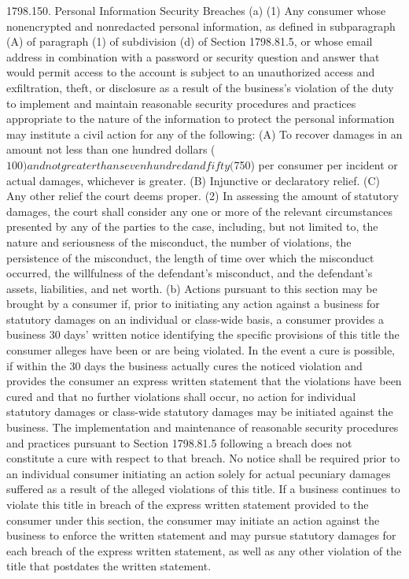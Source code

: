 1798.150.  Personal Information Security Breaches
(a) (1) Any consumer whose nonencrypted and nonredacted personal information, as defined in subparagraph (A) of paragraph (1) of subdivision (d) of Section 1798.81.5, or whose email address in combination with a password or security question and answer that would permit access to the account is subject to an unauthorized access and exfiltration, theft, or disclosure as a result of the business’s violation of the duty to implement and maintain reasonable security procedures and practices appropriate to the nature of the information to protect the personal information may institute a civil action for any of the following:
(A) To recover damages in an amount not less than one hundred dollars ($100) and not greater than seven hundred and fifty ($750) per consumer per incident or actual damages, whichever is greater.
(B) Injunctive or declaratory relief.
(C) Any other relief the court deems proper.
(2) In assessing the amount of statutory damages, the court shall consider any one or more of the relevant circumstances presented by any of the parties to the case, including, but not limited to, the nature and seriousness of the misconduct, the number of violations, the persistence of the misconduct, the length of time over which the misconduct occurred, the willfulness of the defendant’s misconduct, and the defendant’s assets, liabilities, and net worth.
(b) Actions pursuant to this section may be brought by a consumer if, prior to initiating any action against a business for statutory damages on an individual or class-wide basis, a consumer provides a business 30 days’ written notice identifying the specific provisions of this title the consumer alleges have been or are being violated. In the event a cure is possible, if within the 30 days the business actually cures the noticed violation and provides the consumer an express written statement that the violations have been cured and that no further violations shall occur, no action for individual statutory damages or class-wide statutory damages may be initiated against the business. The implementation and maintenance of reasonable security procedures and practices pursuant to Section 1798.81.5 following a breach does not constitute a cure with respect to that breach. No notice shall be required prior to an individual consumer initiating an action solely for actual pecuniary damages suffered as a result of the alleged violations of this title. If a business continues to violate this title in breach of the express written statement provided to the consumer under this section, the consumer may initiate an action against the business to enforce the written statement and may pursue statutory damages for each breach of the express written statement, as well as any other violation of the title that postdates the written statement.
